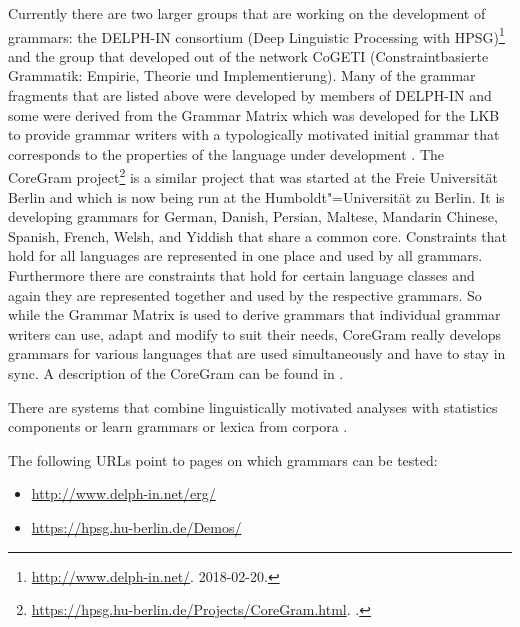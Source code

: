 Currently there are two larger groups that are working on the development of grammars: the DELPH-IN consortium (Deep Linguistic Processing with HPSG)\footnote{%
  \url{http://www.delph-in.net/}. 2018-02-20.
} and the group that developed out of the network CoGETI (Constraintbasierte Grammatik: Empirie, Theorie und
Implementierung).
Many of the grammar fragments that are listed above were developed by members of DELPH-IN and some
were derived from the Grammar Matrix which was developed for the LKB to provide
grammar writers with a typologically motivated initial grammar that corresponds to the properties of
the language under development \citep*{BFO2002a-u}. The CoreGram project\footnote{%
\url{https://hpsg.hu-berlin.de/Projects/CoreGram.html}. \mytoday.
} is a similar project that was started at the Freie Universität Berlin and which is now being run
at the Humboldt"=Universität zu Berlin. It is developing grammars for German, Danish,
Persian, Maltese, Mandarin Chinese,
Spanish, French, Welsh, and Yiddish that share a common core. Constraints
that hold for all languages are represented in one place and used by all grammars. Furthermore there are constraints that
hold for certain language classes and again they are represented together and used by the respective
grammars. So while the Grammar Matrix is used to derive grammars that individual grammar writers can use, adapt and modify to suit
their needs, CoreGram really develops grammars for various languages that are used simultaneously
and have to stay in sync. A description of the CoreGram can be found in .

There are systems that combine linguistically motivated analyses with statistics components
\citep{Brew95a,MNT2005a-u,MT2008a-u} or learn grammars or lexica from corpora \citep{Fouvry2003a-u,CZ2009a-u}. 

The following URLs point to pages on which grammars can be tested:
\begin{itemize}
\item \url{http://www.delph-in.net/erg/}
\item \url{https://hpsg.hu-berlin.de/Demos/}
\end{itemize}


